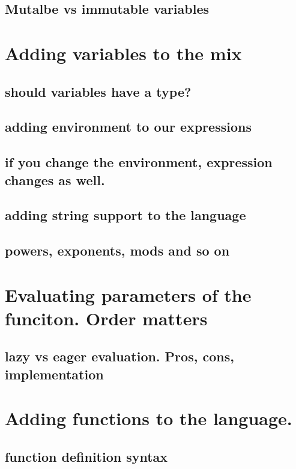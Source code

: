 \documentclass[11pt]{article}
\begin{document}
\subsection{Mutalbe vs immutable variables}
\label{sec:org7af6cce}
\section{Adding variables to the mix}
\label{sec:orgc14814e}
\subsection{should variables have a type?}
\label{sec:orgffc60bd}
\subsection{adding environment to our expressions}
\label{sec:org510ed3d}
\subsection{if you change the environment, expression changes as well.}
\label{sec:org1ea7543}
\subsection{adding string support to the language}
\label{sec:org2d0c36f}

\subsection{powers, exponents, mods and so on}
\label{sec:orgcc899fc}
\section{Evaluating parameters of the funciton. Order matters}
\label{sec:org715dec6}
\subsection{lazy vs eager evaluation. Pros, cons, implementation}
\label{sec:org2e43e6c}
\section{Adding functions to the language.}
\label{sec:org09d67d1}
\subsection{function definition syntax}
\label{sec:orge248215}
\end{document}
